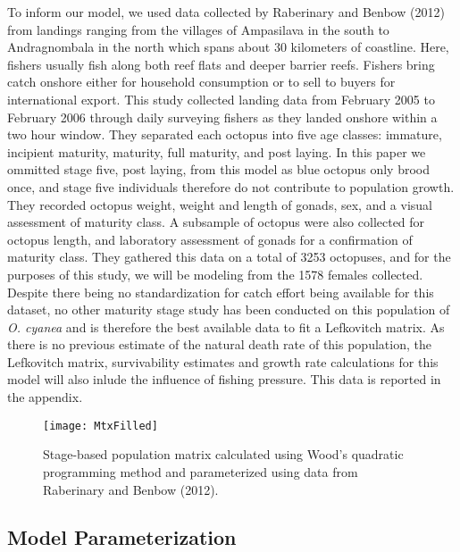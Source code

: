\documentclass[
]{article}
\begin{document}
To inform our model, we used data collected by Raberinary and Benbow (2012) from landings ranging from the villages of Ampasilava in the south to Andragnombala in the north which spans about 30 kilometers of coastline. Here, fishers usually fish along both reef flats and deeper barrier reefs. Fishers bring catch onshore either for household consumption or to sell to buyers for international export. This study collected landing data from February 2005 to February 2006 through daily surveying fishers as they landed onshore within a two hour window. They separated each octopus into five age classes: immature, incipient maturity, maturity, full maturity, and post laying. In this paper we ommitted stage five, post laying, from this model as blue octopus only brood once, and stage five individuals therefore do not contribute to population growth. They recorded octopus weight, weight and length of gonads, sex, and a visual assessment of maturity class. A subsample of octopus were also collected for octopus length, and laboratory assessment of gonads for a confirmation of maturity class. They gathered this data on a total of 3253 octopuses, and for the purposes of this study, we will be modeling from the 1578 females collected. Despite there being no standardization for catch effort being available for this dataset, no other maturity stage study has been conducted on this population of \emph{O. cyanea} and is therefore the best available data to fit a Lefkovitch matrix. As there is no previous estimate of the natural death rate of this population, the Lefkovitch matrix, survivability estimates and growth rate calculations for this model will also inlude the influence of fishing pressure. This data is reported in the appendix.

\begin{figure}
\texttt{[image: MtxFilled]} \caption{Stage-based population matrix calculated using Wood's quadratic programming method and parameterized using data from Raberinary and Benbow (2012). \label{WriteMtxRounded}}\label{fig:WriteMtxRounded}
\end{figure}

\hypertarget{model-parameterization}{%
\subsection{Model Parameterization}\label{model-parameterization}}
\end{document}

